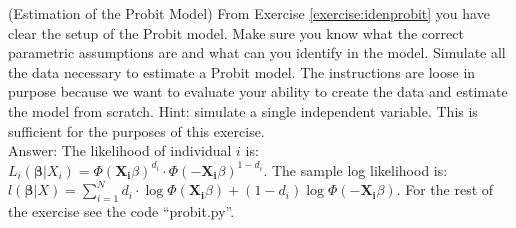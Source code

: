 \setcounter{theorem}{2}
\begin{exercise} (Estimation of the Probit Model)
From Exercise \ref{exercise:idenprobit} you have clear the setup of the Probit model. Make sure you know what the correct parametric assumptions are and what can you identify in the model. Simulate all the data necessary to estimate a Probit model. The instructions are loose in purpose because we want to evaluate your ability to create the data and estimate the model from scratch. Hint: simulate a single independent variable. This is sufficient for the purposes of this exercise.\\
\noindent Answer:
\noindent The likelihood of individual $i$ is: $L_{i} \left( \mathbf{\beta}|X_{i} \right) = \Phi\left( \mathbf{X_{i}} \beta \right)^{d_{i}} \cdot \Phi\left( - \mathbf{X_{i}} \beta \right) ^{1 - d_{i}}  $. The sample log likelihood is: $l \left( \mathbf{\beta}|X \right) = \sum \limits _{i=1} ^{N} d_{i} \cdot  \log \Phi\left( \mathbf{X_{i}} \beta \right) + (1 - d_{i}) \log \Phi\left( - \mathbf{X_{i}} \beta \right)$. For the rest of the exercise see the code ``probit.py''. 
\end{exercise}



